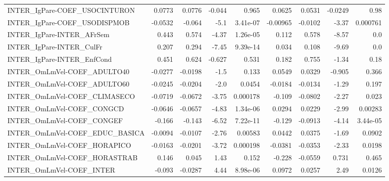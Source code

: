 \begin{tabular}{lrrrrrrrr}
INTER\_IgPare-COEF\_USOCINTURON         &      0.0773 &       0.0776 &  -0.044 &    0.965 &     0.0625 &      0.0531 &      -0.0249 &          0.98 \\
INTER\_IgPare-COEF\_USODISPMOB          &     -0.0532 &       -0.064 &    -5.1 & 3.41e-07 &   -0.00965 &     -0.0102 &        -3.37 &      0.000761 \\
INTER\_IgPare-INTER\_AFrSem             &       0.443 &        0.574 &   -4.37 & 1.26e-05 &      0.112 &       0.578 &        -8.57 &           0.0 \\
INTER\_IgPare-INTER\_CulFr              &       0.207 &        0.294 &   -7.45 & 9.39e-14 &      0.034 &       0.108 &        -9.69 &           0.0 \\
INTER\_IgPare-INTER\_EnfCond            &       0.451 &        0.624 &  -0.627 &    0.531 &      0.182 &       0.755 &        -1.34 &          0.18 \\
INTER\_OmLmVel-COEF\_ADULTO40           &     -0.0277 &      -0.0198 &    -1.5 &    0.133 &     0.0549 &      0.0329 &       -0.905 &         0.366 \\
INTER\_OmLmVel-COEF\_ADULTO60           &     -0.0245 &      -0.0204 &    -2.0 &   0.0454 &    -0.0184 &     -0.0134 &        -1.29 &         0.197 \\
INTER\_OmLmVel-COEF\_CLIMASECO          &     -0.0719 &      -0.0672 &   -3.75 & 0.000178 &     -0.109 &     -0.0802 &        -2.27 &         0.023 \\
INTER\_OmLmVel-COEF\_CONGCD             &     -0.0646 &      -0.0657 &   -4.83 & 1.34e-06 &     0.0294 &      0.0229 &        -2.99 &       0.00283 \\
INTER\_OmLmVel-COEF\_CONGEF             &      -0.166 &       -0.143 &   -6.52 & 7.22e-11 &     -0.129 &     -0.0913 &        -4.14 &      3.44e-05 \\
INTER\_OmLmVel-COEF\_EDUC\_BASICA        &     -0.0094 &      -0.0107 &   -2.76 &  0.00583 &     0.0442 &      0.0375 &        -1.69 &        0.0902 \\
INTER\_OmLmVel-COEF\_HORAPICO           &     -0.0163 &      -0.0201 &   -3.72 & 0.000198 &    -0.0381 &     -0.0353 &        -2.33 &        0.0198 \\
INTER\_OmLmVel-COEF\_HORASTRAB          &       0.146 &        0.045 &    1.43 &    0.152 &     -0.228 &     -0.0559 &        0.731 &         0.465 \\
INTER\_OmLmVel-COEF\_INTER              &      -0.093 &      -0.0287 &    4.44 & 8.98e-06 &     0.0972 &      0.0257 &         2.49 &        0.0126 \\

\end{tabular}
